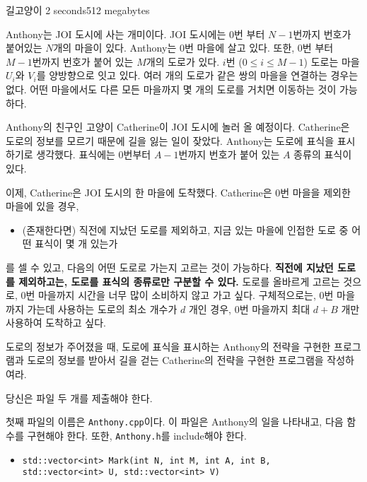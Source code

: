 \begin{problem}{길고양이}
	{}{}
	{2 seconds}{512 megabytes}{}
	
	Anthony는 JOI 도시에 사는 개미이다. JOI 도시에는 $0$번 부터 $N-1$번까지 번호가 붙어있는 $N$개의 마을이 있다. Anthony는 $0$번 마을에 살고 있다. 또한, $0$번 부터 $M-1$번까지 번호가 붙어 있는 $M$개의 도로가 있다. $i$번 ($0 \le i \le M-1$) 도로는 마을 $U_i$와 $V_i$를 양방향으로 잇고 있다. 여러 개의 도로가 같은 쌍의 마을을 연결하는 경우는 없다. 어떤 마을에서도 다른 모든 마을까지 몇 개의 도로를 거치면 이동하는 것이 가능하다.
	
	Anthony의 친구인 고양이 Catherine이 JOI 도시에 놀러 올 예정이다. Catherine은 도로의 정보를 모르기 때문에 길을 잃는 일이 잦았다. Anthony는 도로에 표식을 표시하기로 생각했다. 표식에는 $0$번부터 $A-1$번까지 번호가 붙어 있는 $A$ 종류의 표식이 있다.
	
	이제, Catherine은 JOI 도시의 한 마을에 도착했다. Catherine은 $0$번 마을을 제외한 마을에 있을 경우, 
	
	\begin{itemize}
		\item[] (존재한다면) 직전에 지났던 도로를 제외하고, 지금 있는 마을에 인접한 도로 중 어떤 표식이 몇 개 있는가
	\end{itemize}
	
	를 셀 수 있고, 다음의 어떤 도로로 가는지 고르는 것이 가능하다. \textbf{직전에 지났던 도로를 제외하고는, 도로를 표식의 종류로만 구분할 수 있다.} 도로를 올바르게 고르는 것으로, $0$번 마을까지 시간을 너무 많이 소비하지 않고 가고 싶다. 구체적으로는, $0$번 마을까지 가는데 사용하는 도로의 최소 개수가 $d$ 개인 경우, $0$번 마을까지 최대 $d+B$ 개만 사용하여 도착하고 싶다.
	
	도로의 정보가 주어졌을 때, 도로에 표식을 표시하는 Anthony의 전략을 구현한 프로그램과 도로의 정보를 받아서 길을 걷는 Catherine의 전략을 구현한 프로그램을 작성하여라.
	
	\Specification
	
	당신은 파일 두 개를 제출해야 한다.
	
	첫째 파일의 이름은 \texttt{Anthony.cpp}이다. 이 파일은 Anthony의 일을 나타내고, 다음 함수를 구현해야 한다. 또한, \texttt{Anthony.h}를 include해야 한다.
	
	\begin{itemize}
		\item \texttt{std::vector<int> Mark(int N, int M, int A, int B,\\ \phantom{std::vector<int> Mark(}std::vector<int> U, std::vector<int> V)}
		

\end{itemize}
\end{problem}

